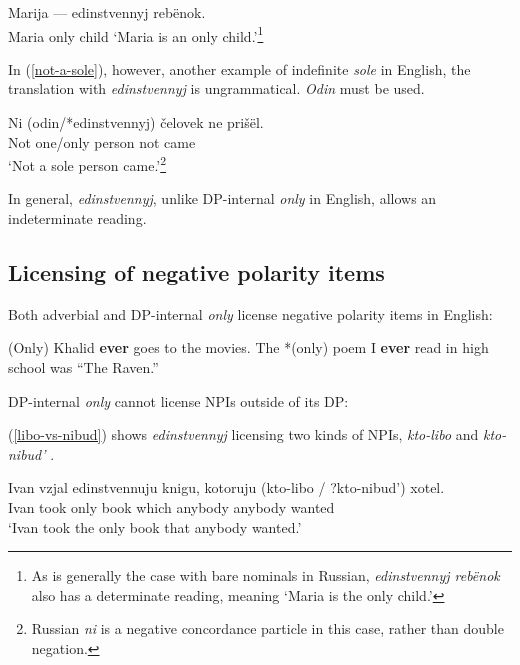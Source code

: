 \begin{exe}
	\ex \label{only-child-ru} Marija --- edinstvennyj reb\"{e}nok.\\
	Maria {} only child
	\glt `Maria is an only child.'\footnote{As is generally the case with bare nominals in Russian, \textit{edinstvennyj reb\"{e}nok} also has a determinate reading, meaning `Maria is the only child.'}
\end{exe}

In (\ref{not-a-sole}), however, another example of indefinite \textit{sole} in English, the translation with \textit{edinstvennyj} is ungrammatical. \textit{Odin} must be used.

\begin{exe}
	\ex \label{not-a-sole} \gll Ni (odin/*edinstvennyj) \v{c}elovek ne pri\v{s}\"{e}l.\\
	Not one/only person not came\\
	\glt `Not a sole person came.'\footnote{Russian \textit{ni} is a negative concordance particle in this case, rather than double negation.}
\end{exe}

In general, \textit{edinstvennyj}, unlike DP-internal \textit{only} in English, allows an indeterminate reading.

\subsection{Licensing of negative polarity items}
Both adverbial and DP-internal \textit{only} license negative polarity items in English:

\begin{exe}
	\ex *(Only) Khalid \textbf{ever} goes to the movies.
	\ex The *(only) poem I \textbf{ever} read in high school was ``The Raven.''
\end{exe}

DP-internal \textit{only} cannot license NPIs outside of its DP:

\begin{exe}
\end{exe}

(\ref{libo-vs-nibud}) shows \textit{edinstvennyj} licensing two kinds of NPIs, \textit{kto-libo} \citep{pereltsvaig06} and \textit{kto-nibud'} \citep{russneg}.

\begin{exe}
	\ex \label{libo-vs-nibud} \gll Ivan vzjal edinstvennuju knigu, kotoruju (kto-libo / ?kto-nibud') xotel.\\
	Ivan took only book which anybody {} anybody wanted\\
	\glt `Ivan took the only book that anybody wanted.'
\end{exe}

